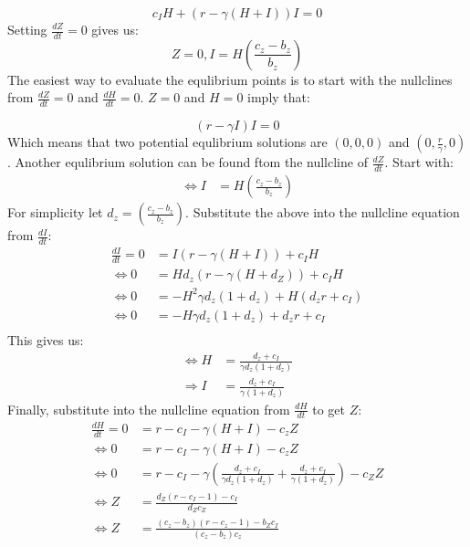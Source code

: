 \documentclass[
	12pt
]{article}
\begin{document}
\begin{equation}
c_IH+(r-\gamma(H+I))I = 0
\end{equation}
Setting $\frac{dZ}{dt}=0$ gives us:
\begin{equation}
Z=0, I = H \left(\frac{c_z-b_z}{b_z}\right)
\end{equation}
The easiest way to evaluate the equlibrium points is to start with the nullclines from $\frac{dZ}{dt}=0$ and $\frac{dH}{dt}=0$. $Z=0$ and $H=0$ imply that:

\begin{equation}
(r-\gamma I)I = 0
\end{equation}
Which means that two potential equlibrium solutions are $(0, 0, 0)$ and $(0,\frac{r}{\gamma},0)$. Another equlibrium solution can be found ftom the nullcline of $\frac{dZ}{dt}$. Start with:		
			\begin{align*}
				\Leftrightarrow I &= H \left(\frac{c_z-b_z}{b_z}\right)
			\end{align*}
				For simplicity let $d_z = \left(\frac{c_z-b_z}{b_z}\right)$. Substitute the above into the nullcline equation from $\frac{dI}{dt}$:
			\begin{align*}
				\frac{dI}{dt}= 0 &= I(r-\gamma(H+I))+c_IH \\
				\Leftrightarrow 0&= H d_z \left(r-\gamma \left(H+d_Z\right)\right)+c_I H\\
				\Leftrightarrow 0&= -H^2\gamma d_z(1+d_z) + H\left(d_zr+ c_I\right) \\ 
				\Leftrightarrow 0&= -H \gamma d_z\left(1+d_z\right) +d_z r+ c_I \\
			\end{align*}
This gives us:
			\begin{align*}
				\Leftrightarrow H &= \frac{d_z +c_I}{\gamma d_z(1+d_z)} \\
				\Rightarrow I &=  \frac{d_z +c_I}{\gamma (1+d_z)} 
			\end{align*}
Finally, substitute into the nullcline equation from $\frac{dH}{dt}$ to get $Z$:
			\begin{align*}
				\frac{dH}{dt} = 0 &= r-c_I-\gamma(H+I)-c_zZ\\
				\Leftrightarrow 0&= r-c_I -\gamma (H+I)-c_z Z\\
				\Leftrightarrow 0 &= r-c_I - \gamma \left( \frac{d_z +c_I}{\gamma d_z(1+d_z)} +  \frac{d_z +c_I}{\gamma (1+d_z)} \right) - c_Z Z \\
				\Leftrightarrow Z &= \frac{d_Z(r-c_I-1)-c_I}{d_Z c_Z} \\
				\Leftrightarrow Z &= \frac{(c_z-b_z)(r-c_z-1)-b_Zc_I}{(c_z-b_z)c_z}
			\end{align*}
\end{document}
